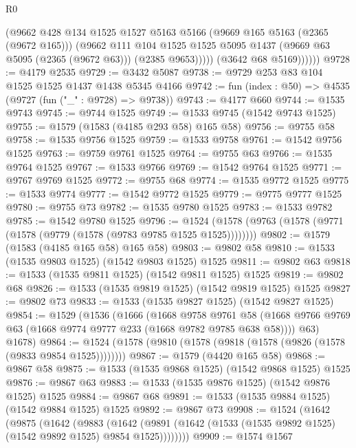\begin{lexlean}{R0}
\begin{coremodule}
                  (@9662
                    @428
                    @134
                    @1525
                    @1527
                    @5163
                    @5166
                    (@9669 @165 @5163 (@2365 (@9672 @165)))
                    (@9662
                      @111
                      @104
                      @1525
                      @1525
                      @5095
                      @1437
                      (@9669 @63 @5095 (@2365 (@9672 @63)))
                      (@2385 @9653)))))
              (@3642 @68 @5169))))))
@9728 := @4179 @2535
@9729 := @3432 @5087
@9738 := @9729 @253 @83 @104 @1525 @1525 @1437 @1438 @5345 @4166
@9742 := fun (index : @50) => @4535 (@9727 (fun ("_" : @9728) => @9738))
@9743 := @4177 @660
@9744 := @1535 @9743
@9745 := @9744 @1525
@9749 := @1533 @9745 (@1542 @9743 @1525)
@9755 := @1579 (@1583 (@4185 @293 @58) @165 @58)
@9756 := @9755 @58
@9758 := @1535 @9756 @1525
@9759 := @1533 @9758
@9761 := @1542 @9756 @1525
@9763 := @9759 @9761 @1525
@9764 := @9755 @63
@9766 := @1535 @9764 @1525
@9767 := @1533 @9766
@9769 := @1542 @9764 @1525
@9771 := @9767 @9769 @1525
@9772 := @9755 @68
@9774 := @1535 @9772 @1525
@9775 := @1533 @9774
@9777 := @1542 @9772 @1525
@9779 := @9775 @9777 @1525
@9780 := @9755 @73
@9782 := @1535 @9780 @1525
@9783 := @1533 @9782
@9785 := @1542 @9780 @1525
@9796 := @1524 (@1578 (@9763 (@1578 (@9771 (@1578 (@9779 (@1578 (@9783 @9785 @1525 @1525))))))))
@9802 := @1579 (@1583 (@4185 @165 @58) @165 @58)
@9803 := @9802 @58
@9810 := @1533 (@1535 @9803 @1525) (@1542 @9803 @1525) @1525
@9811 := @9802 @63
@9818 := @1533 (@1535 @9811 @1525) (@1542 @9811 @1525) @1525
@9819 := @9802 @68
@9826 := @1533 (@1535 @9819 @1525) (@1542 @9819 @1525) @1525
@9827 := @9802 @73
@9833 := @1533 (@1535 @9827 @1525) (@1542 @9827 @1525)
@9854 := @1529
    (@1536
      (@1666
        (@1668
          @9758
          @9761
          @58
          (@1668 @9766 @9769 @63 (@1668 @9774 @9777 @233 (@1668 @9782 @9785 @638 @58))))
        @63)
      @1678)
@9864 := @1524 (@1578 (@9810 (@1578 (@9818 (@1578 (@9826 (@1578 (@9833 @9854 @1525))))))))
@9867 := @1579 (@4420 @165 @58)
@9868 := @9867 @58
@9875 := @1533 (@1535 @9868 @1525) (@1542 @9868 @1525) @1525
@9876 := @9867 @63
@9883 := @1533 (@1535 @9876 @1525) (@1542 @9876 @1525) @1525
@9884 := @9867 @68
@9891 := @1533 (@1535 @9884 @1525) (@1542 @9884 @1525) @1525
@9892 := @9867 @73
@9908 := @1524
    (@1642
      (@9875
        (@1642
          (@9883
            (@1642 (@9891 (@1642 (@1533 (@1535 @9892 @1525) (@1542 @9892 @1525) @9854 @1525))))))))
@9909 := @1574 @1567

\end{coremodule}
\end{lexlean}
